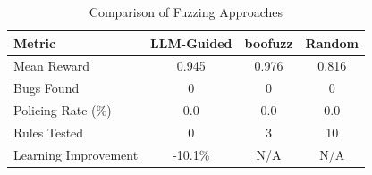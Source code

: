 
\begin{table}[htbp]
\centering
\caption{Comparison of Fuzzing Approaches}
\label{tab:fuzzer-comparison}
\begin{tabular}{lccc}
\toprule
\textbf{Metric} & \textbf{LLM-Guided} & \textbf{boofuzz} & \textbf{Random} \\
\midrule
Mean Reward & 0.945 & 0.976 & 0.816 \\
Bugs Found & 0 & 0 & 0 \\
Policing Rate (\%) & 0.0 & 0.0 & 0.0 \\
Rules Tested & 0 & 3 & 10 \\
Learning Improvement & -10.1\% & N/A & N/A \\
\bottomrule
\end{tabular}
\end{table}